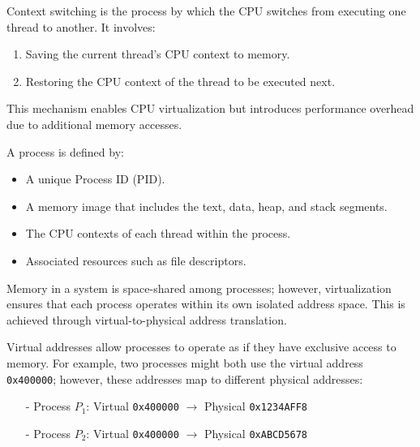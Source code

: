\begin{definition}
Context switching is the process by which the CPU switches from executing one thread to another. It involves:
\begin{enumerate}
    \item Saving the current thread's CPU context to memory.
    \item Restoring the CPU context of the thread to be executed next.
\end{enumerate}
This mechanism enables CPU virtualization but introduces performance overhead due to additional memory accesses.
\end{definition}
\vspace{10px}
\begin{definition}[Process]
A process is defined by:
\begin{itemize}
    \item A unique Process ID (PID).
    \item A memory image that includes the text, data, heap, and stack segments.
    \item The CPU contexts of each thread within the process.
    \item Associated resources such as file descriptors.
\end{itemize}
\end{definition}
\vspace{10px}
\begin{definition}
Memory in a system is space-shared among processes; however, virtualization ensures that each process operates within its own isolated address space. This is achieved through virtual-to-physical address translation.
\end{definition}
\vspace{10px}
\begin{definition}
Virtual addresses allow processes to operate as if they have exclusive access to memory. For example, two processes might both use the virtual address \texttt{0x400000}; however, these addresses map to different physical addresses:
\begin{itemize}
  \item[-] Process \( P_1 \): Virtual \texttt{0x400000} \(\rightarrow\) Physical \texttt{0x1234AFF8}
  \item[-] Process \( P_2 \): Virtual \texttt{0x400000} \(\rightarrow\) Physical \texttt{0xABCD5678}
\end{itemize}
\end{definition}
